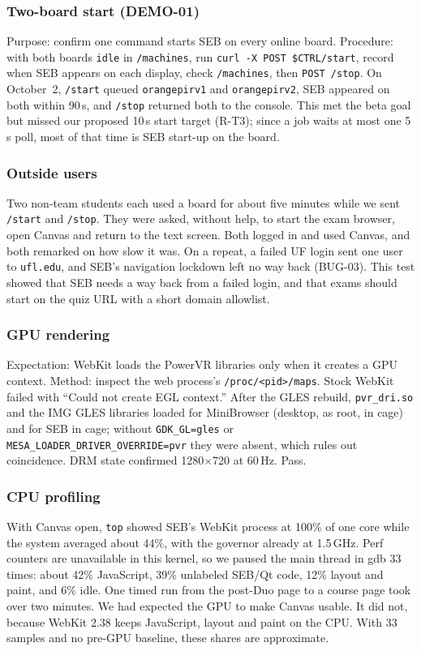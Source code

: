 \documentclass[11pt]{article}
\begin{document}
\subsubsection*{Two-board start (DEMO-01)}
Purpose: confirm one command starts SEB on every online board. Procedure: with both boards \texttt{idle} in \texttt{/machines}, run \texttt{curl -X POST \$CTRL/start}, record when SEB appears on each display, check \texttt{/machines}, then \texttt{POST /stop}. On October~2, \texttt{/start} queued \texttt{orangepirv1} and \texttt{orangepirv2}, SEB appeared on both within 90\,s, and \texttt{/stop} returned both to the console. This met the beta goal but missed our proposed 10\,s start target (R-T3); since a job waits at most one 5\,s poll, most of that time is SEB start-up on the board.

\subsubsection*{Outside users}
Two non-team students each used a board for about five minutes while we sent \texttt{/start} and \texttt{/stop}. They were asked, without help, to start the exam browser, open Canvas and return to the text screen. Both logged in and used Canvas, and both remarked on how slow it was. On a repeat, a failed UF login sent one user to \texttt{ufl.edu}, and SEB's navigation lockdown left no way back (BUG-03). This test showed that SEB needs a way back from a failed login, and that exams should start on the quiz URL with a short domain allowlist.

\subsubsection*{GPU rendering}
Expectation: WebKit loads the PowerVR libraries only when it creates a GPU context. Method: inspect the web process's \texttt{/proc/<pid>/maps}. Stock WebKit failed with ``Could not create EGL context.'' After the GLES rebuild, \texttt{pvr\_dri.so} and the IMG GLES libraries loaded for MiniBrowser (desktop, as root, in cage) and for SEB in cage; without \texttt{GDK\_GL=gles} or \texttt{MESA\_LOADER\_DRIVER\_OVERRIDE=pvr} they were absent, which rules out coincidence. DRM state confirmed 1280$\times$720 at 60\,Hz. Pass.

\subsubsection*{CPU profiling}
With Canvas open, \texttt{top} showed SEB's WebKit process at 100\% of one core while the system averaged about 44\%, with the governor already at 1.5\,GHz. Perf counters are unavailable in this kernel, so we paused the main thread in gdb 33 times: about 42\% JavaScript, 39\% unlabeled SEB/Qt code, 12\% layout and paint, and 6\% idle. One timed run from the post-Duo page to a course page took over two minutes. We had expected the GPU to make Canvas usable. It did not, because WebKit 2.38 keeps JavaScript, layout and paint on the CPU. With 33 samples and no pre-GPU baseline, these shares are approximate.
\end{document}
